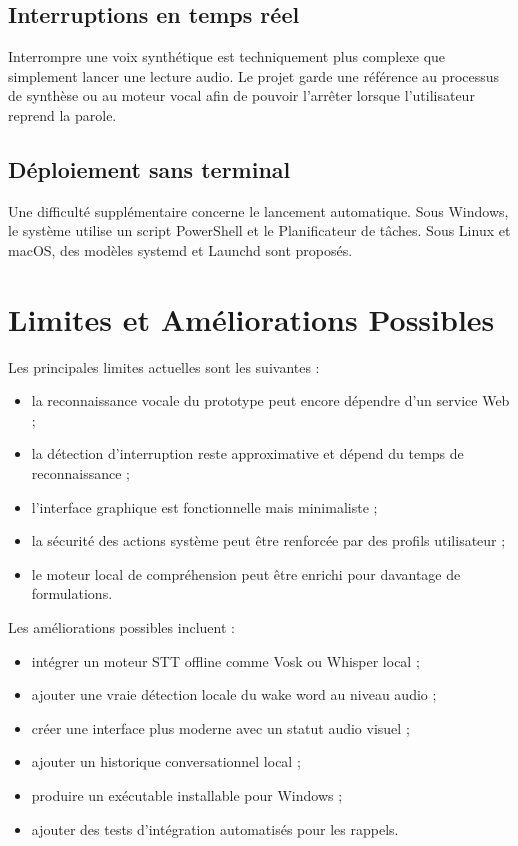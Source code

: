 \documentclass[12pt,a4paper]{report}
\begin{document}
\section{Interruptions en temps réel}

Interrompre une voix synthétique est techniquement plus complexe que simplement
lancer une lecture audio. Le projet garde une référence au processus de synthèse
ou au moteur vocal afin de pouvoir l'arrêter lorsque l'utilisateur reprend la
parole.

\section{Déploiement sans terminal}

Une difficulté supplémentaire concerne le lancement automatique. Sous Windows,
le système utilise un script PowerShell et le Planificateur de tâches. Sous
Linux et macOS, des modèles systemd et Launchd sont proposés.

\chapter{Limites et Améliorations Possibles}

Les principales limites actuelles sont les suivantes :

\begin{itemize}[label=--]
  \item la reconnaissance vocale du prototype peut encore dépendre d'un service Web ;
  \item la détection d'interruption reste approximative et dépend du temps de reconnaissance ;
  \item l'interface graphique est fonctionnelle mais minimaliste ;
  \item la sécurité des actions système peut être renforcée par des profils utilisateur ;
  \item le moteur local de compréhension peut être enrichi pour davantage de formulations.
\end{itemize}

Les améliorations possibles incluent :

\begin{itemize}[label=--]
  \item intégrer un moteur STT offline comme Vosk ou Whisper local ;
  \item ajouter une vraie détection locale du wake word au niveau audio ;
  \item créer une interface plus moderne avec un statut audio visuel ;
  \item ajouter un historique conversationnel local ;
  \item produire un exécutable installable pour Windows ;
  \item ajouter des tests d'intégration automatisés pour les rappels.
\end{itemize}
\end{document}
